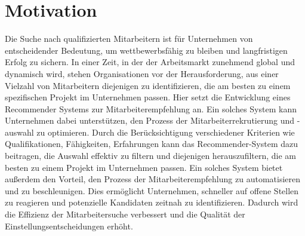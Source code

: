 \documentclass[a4paper,12pt]{scrreprt}
\newcommand{\hiddenchapter}[1]{
	\chapter*{{#1}}
}
\begin{document}
\pagestyle{empty}




\pagestyle{fancy}


\newpage

\newpage

\setcounter{page}{1}
\pagestyle{fancy}
\setcounter{chapter}{0}
\newpage

\hiddenchapter{Motivation}
Die Suche nach qualifizierten Mitarbeitern ist für Unternehmen von entscheidender Bedeutung, um wettbewerbsfähig zu bleiben und langfristigen Erfolg zu sichern. In einer Zeit, in der der Arbeitsmarkt zunehmend global und dynamisch wird, stehen Organisationen vor der Herausforderung, aus einer Vielzahl von Mitarbeitern diejenigen zu identifizieren, die am besten zu einem spezifischen Projekt im Unternehmen passen. Hier setzt die Entwicklung eines Recommender Systems zur Mitarbeiterempfehlung an. Ein solches System kann Unternehmen dabei unterstützen, den Prozess der Mitarbeiterrekrutierung und -auswahl zu optimieren. Durch die Berücksichtigung verschiedener Kriterien wie Qualifikationen, Fähigkeiten, Erfahrungen kann das Recommender-System dazu beitragen, die Auswahl effektiv zu filtern und diejenigen herauszufiltern, die am besten zu einem Projekt im Unternehmen passen. Ein solches System bietet außerdem den Vorteil, den Prozess der Mitarbeiterempfehlung zu automatisieren und zu beschleunigen. Dies ermöglicht Unternehmen, schneller auf offene Stellen zu reagieren und potenzielle Kandidaten zeitnah zu identifizieren. Dadurch wird die Effizienz der Mitarbeitersuche verbessert und die Qualität der Einstellungsentscheidungen erhöht.\\
\end{document}
